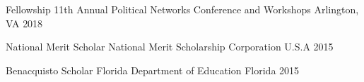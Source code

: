 

\begin{cvhonors}

  \cvhonor
    {Fellowship} %
    {11th Annual Political Networks Conference and Workshops} %
    {Arlington, VA} %
    {2018} %

  \cvhonor
    {National Merit Scholar} %
    {National Merit Scholarship Corporation} %
    {U.S.A} %
    {2015} %

  \cvhonor
    {Benacquisto Scholar} %
    {Florida Department of Education} %
    {Florida} %
    {2015} %

\end{cvhonors}
